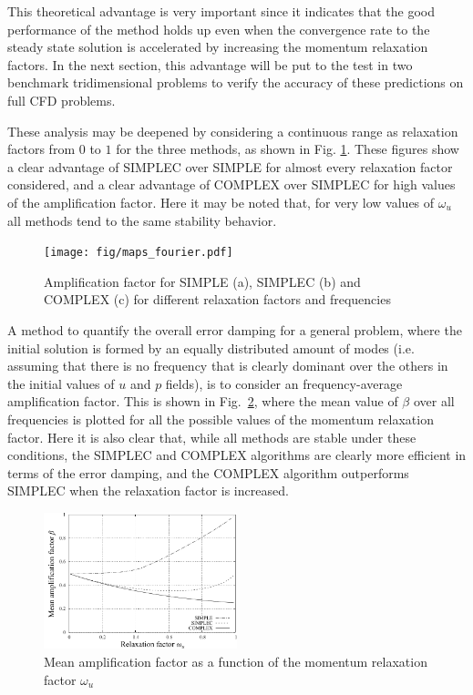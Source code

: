 \documentclass[final,3p,times,11pt,onecolumn]{myElsarticle}
\numberwithin{equation}{section}
\begin{document}
This theoretical advantage is very important since it indicates that the good performance of the method holds up even when the convergence rate to the steady state solution is accelerated by increasing the momentum relaxation factors. In the next section, this advantage will be put to the test in two benchmark tridimensional problems to verify the accuracy of these predictions on full CFD problems.

These analysis may be deepened by considering a continuous range as relaxation factors from $0$ to $1$ for the three methods, as shown in Fig. \ref{fig:1c}. These figures show a clear advantage of SIMPLEC over SIMPLE for almost every relaxation factor considered, and a clear advantage of COMPLEX over SIMPLEC for high values of the amplification factor. Here it may be noted that, for very low values of $\omega_u$ all methods tend to the same stability behavior.

\begin{figure}[b!]
    \centering
    \texttt{[image: fig/maps\_fourier.pdf]}
    \caption{Amplification factor for SIMPLE (a), SIMPLEC (b) and COMPLEX (c) for different relaxation factors and frequencies}
    \label{fig:1c}
\end{figure}    
    
A method to quantify the overall error damping for a general problem, where the initial solution is formed by an equally distributed amount of modes (i.e. assuming that there is no frequency that is clearly dominant over the others in the initial values of $u$ and $p$ fields), is to consider an frequency-average amplification factor. This is shown in Fig.~\ref{fig:1d}, where the mean value of $\beta$ over all frequencies is plotted for all the possible values of the momentum relaxation factor. Here it is also clear that, while all methods are stable under these conditions, the SIMPLEC and COMPLEX algorithms are clearly more efficient in terms of the error damping, and the COMPLEX algorithm outperforms SIMPLEC when the relaxation factor is increased. 

\begin{figure}[t!]
    \centering
    \includegraphics[width=0.5\textwidth]{fig/meanAmp.pdf}
    \caption{Mean amplification factor as a function of the momentum relaxation factor $\omega_u$}
    \label{fig:1d}
\end{figure}  
\end{document}
